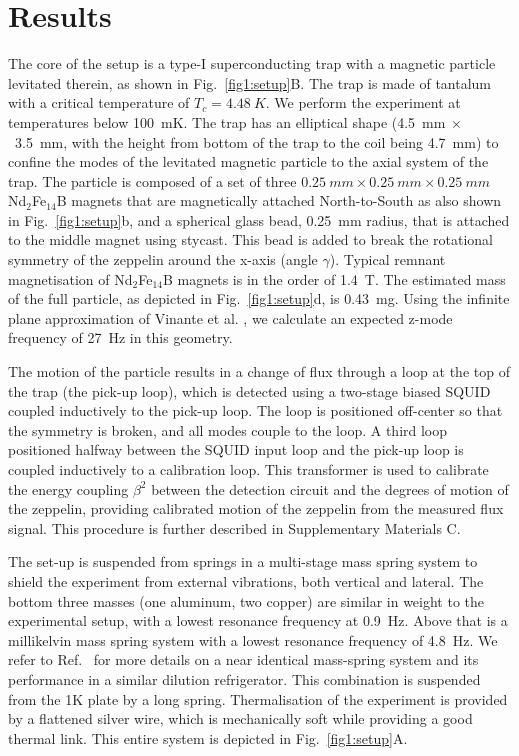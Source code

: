 \documentclass[pdflatex,sn-mathphys,12pt]{sn-jnl}
\begin{document}
\section{Results}\label{sec:setup}
    The core of the setup is a type-I superconducting trap with a magnetic particle levitated therein, as shown in Fig.~\ref{fig1:setup}B.
    The trap is made of tantalum with a critical temperature of $T_c = \SI{4.48}{K}$. We perform the experiment at temperatures below \SI{100}{mK}.
    The trap has an elliptical shape (\SI{4.5}{mm}$~\times$~\SI{3.5}{mm}, with the height from bottom of the trap to the coil being \SI{4.7}{mm}) to confine the modes of the levitated magnetic particle to the axial system of the trap.
    The particle is composed of a set of three $\SI{0.25}{mm} \times \SI{0.25}{mm} \times \SI{0.25}{mm}$ Nd$_{2}$Fe$_{14}$B magnets that are magnetically attached North-to-South as also shown in Fig.~\ref{fig1:setup}b, and a spherical glass bead, \SI{0.25}{mm} radius, that is attached to the middle magnet using stycast. This bead is added to break the rotational symmetry of the zeppelin around the x-axis (angle $\gamma$).
    Typical remnant magnetisation of Nd$_{2}$Fe$_{14}$B magnets is in the order of \SI{1.4}{T}.
    The estimated mass of the full particle, as depicted in Fig.~\ref{fig1:setup}d, is \SI{0.43}{mg}.
    Using the infinite plane approximation of Vinante et al. \cite{vinante2020}, we calculate an expected z-mode frequency of \SI{27}{Hz} in this geometry.
    
    The motion of the particle results in a change of flux through a loop at the top of the trap (the pick-up loop), which is detected using a two-stage biased SQUID coupled inductively to the pick-up loop. The loop is positioned off-center so that the symmetry is broken, and all modes couple to the loop.
    A third loop positioned halfway between the SQUID input loop and the pick-up loop is coupled inductively to a calibration loop. This transformer is used to calibrate the energy coupling $\beta^2$ between the detection circuit and the degrees of motion of the zeppelin, providing calibrated motion of the zeppelin from the measured flux signal.
    This procedure is further described in Supplementary Materials C.
    
    The set-up is suspended from springs in a multi-stage mass spring system to shield the experiment from external vibrations, both vertical and lateral.
    The bottom three masses (one aluminum, two copper) are similar in weight to the experimental setup, with a lowest resonance frequency at \SI{0.9}{Hz}.
    Above that is a millikelvin mass spring system with a lowest resonance frequency of \SI{4.8}{Hz}.
    We refer to Ref.~\cite{wit2019} for more details on a near identical mass-spring system and its performance in a similar dilution refrigerator.
    This combination is suspended from the 1K plate by a long spring. 
    Thermalisation of the experiment is provided by a flattened silver wire, which is mechanically soft while providing a good thermal link.
    This entire system is depicted in Fig.~\ref{fig1:setup}A. 
    
\end{document}
